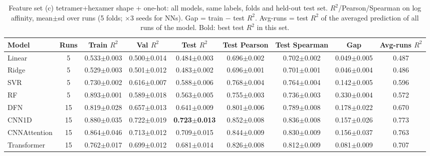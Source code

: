 \begin{table}[H]\centering\scriptsize\setlength{\tabcolsep}{3pt}
\caption{Feature set (c) tetramer+hexamer shape + one-hot: all models, same labels, folds and held-out test set. $R^2$/Pearson/Spearman on log affinity, mean$\pm$sd over runs (5 folds; $\times$3 seeds for NNs). Gap = train $-$ test $R^2$. Avg-runs = test $R^2$ of the averaged prediction of all runs of the model. Bold: best test $R^2$ in this set.}
\begin{tabular}{lcccccccc}\toprule
Model & Runs & Train $R^2$ & Val $R^2$ & Test $R^2$ & Test Pearson & Test Spearman & Gap & Avg-runs $R^2$\\\midrule
Linear & 5 & 0.533$\pm$0.003 & 0.500$\pm$0.014 & 0.484$\pm$0.003 & 0.696$\pm$0.002 & 0.702$\pm$0.002 & 0.049$\pm$0.005 & 0.487 \\
Ridge & 5 & 0.529$\pm$0.003 & 0.501$\pm$0.012 & 0.483$\pm$0.002 & 0.696$\pm$0.001 & 0.701$\pm$0.001 & 0.046$\pm$0.004 & 0.486 \\
SVR & 5 & 0.730$\pm$0.002 & 0.616$\pm$0.007 & 0.588$\pm$0.006 & 0.768$\pm$0.004 & 0.764$\pm$0.004 & 0.142$\pm$0.005 & 0.596 \\
RF & 5 & 0.893$\pm$0.001 & 0.589$\pm$0.018 & 0.563$\pm$0.005 & 0.755$\pm$0.003 & 0.736$\pm$0.003 & 0.330$\pm$0.004 & 0.572 \\
DFN & 15 & 0.819$\pm$0.028 & 0.657$\pm$0.013 & 0.641$\pm$0.009 & 0.801$\pm$0.006 & 0.789$\pm$0.008 & 0.178$\pm$0.022 & 0.670 \\
CNN1D & 15 & 0.880$\pm$0.035 & 0.722$\pm$0.019 & \textbf{0.723$\pm$0.013} & 0.852$\pm$0.008 & 0.836$\pm$0.008 & 0.157$\pm$0.026 & 0.773 \\
CNNAttention & 15 & 0.864$\pm$0.046 & 0.713$\pm$0.012 & 0.709$\pm$0.015 & 0.844$\pm$0.009 & 0.830$\pm$0.009 & 0.156$\pm$0.037 & 0.763 \\
Transformer & 15 & 0.762$\pm$0.017 & 0.699$\pm$0.012 & 0.681$\pm$0.014 & 0.826$\pm$0.008 & 0.812$\pm$0.009 & 0.081$\pm$0.009 & 0.707 \\
\bottomrule\end{tabular}\label{tab:fs_tetrahexa}\end{table}

